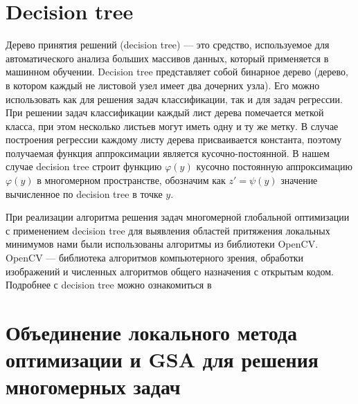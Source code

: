 \documentclass{svproc}
\begin{document}
\section{Decision tree}

Дерево принятия решений (decision tree) --- это средство, используемое для автоматического анализа больших массивов данных, который применяется в машинном обучении. Decision tree представляет собой бинарное дерево (дерево, в котором каждый не листовой узел имеет два дочерних узла). Его можно использовать как для решения задач классификации, так и для задач регрессии. При решении задач классификации каждый лист дерева помечается меткой класса, при этом несколько листьев могут иметь одну и ту же метку. В случае построения регрессии каждому листу дерева присваивается константа, поэтому получаемая функция аппроксимации является кусочно-постоянной.
В нашем случае decision tree строит функцию $\varphi(y)$ кусочно постоянную аппроксимацию$\varphi(y)$  в многомерном пространстве, обозначим как $z' = \psi(y)$ значение вычисленное по decision tree в точке $y$.


При реализации алгоритма  решения задач многомерной глобальной оптимизации с применением decision tree для выявления областей притяжения локальных минимумов нами были использованы алгоритмы из библиотеки OpenCV. OpenCV --- библиотека алгоритмов компьютерного зрения, обработки изображений и численных алгоритмов общего назначения с открытым кодом. Подробнее с decision tree можно ознакомиться в \cite{fio_bib16}




\section{Объединение локального метода оптимизации и GSA для решения многомерных задач}
\end{document}
